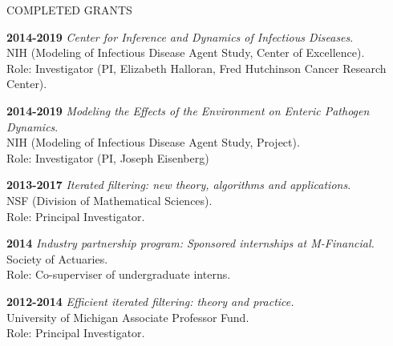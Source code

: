 \lsp

\begin{mylist} {COMPLETED GRANTS}

\item{\bf 2014-2019 } {\em Center for Inference and Dynamics of Infectious Diseases}.
\\
NIH (Modeling of Infectious Disease Agent Study, Center of Excellence). \\
Role: Investigator (PI, Elizabeth Halloran, Fred Hutchinson Cancer Research Center).

\item{\bf 2014-2019 } {\em Modeling the Effects of the Environment on Enteric Pathogen Dynamics}.
\\
NIH (Modeling of Infectious Disease Agent Study, Project). \\
Role: Investigator (PI, Joseph Eisenberg)  

\item{\bf 2013-2017 } {\em Iterated filtering: new theory, algorithms and applications}.\\
NSF (Division of Mathematical Sciences).\\
Role: Principal Investigator.


\item{\bf 2014 } {\em  Industry partnership program: Sponsored internships at M-Financial.}\\
Society of Actuaries.\\
Role: Co-superviser of undergraduate interns.

\item{\bf 2012-2014 } {\em Efficient iterated filtering: theory and practice.}\\
University of Michigan Associate Professor Fund.\\
Role: Principal Investigator.



\end{mylist}
